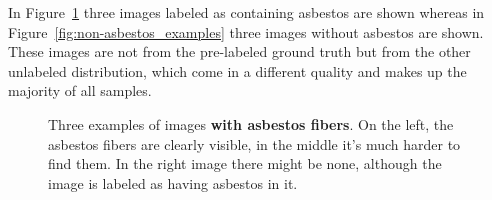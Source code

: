 In Figure~\ref{fig:asbestos_examples} three images labeled as containing asbestos are shown whereas in Figure~\ref{fig:non-asbestos_examples} three images without asbestos are shown. These images are not from the pre-labeled ground truth but from the other unlabeled distribution, which come in a different quality and makes up the majority of all samples. \\

\begin{figure}[h]
\centering
\caption{Three examples of images \textbf{with asbestos fibers}. On the left, the asbestos fibers are clearly visible, in the middle it's much harder to find them. In the right image there might be none, although the image is labeled as having asbestos in it.}
\label{fig:asbestos_examples}
\end{figure}

